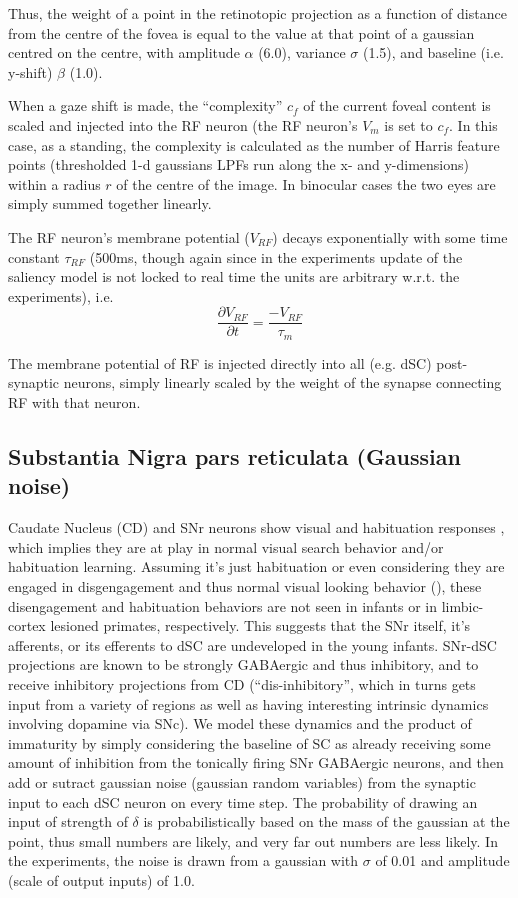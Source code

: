 \documentclass[conference]{IEEEtran}
\begin{document}
Thus, the weight of a point in the retinotopic projection as a
function of distance from the centre of the fovea is equal to the
value at that point of a gaussian centred on the centre, with
amplitude $\alpha$ (6.0), variance $\sigma$ (1.5), and baseline
(i.e. y-shift) $\beta$ (1.0).

When a gaze shift is made, the ``complexity'' $c_f$ of the current
foveal content is scaled and injected into the RF neuron (the RF
neuron's $V_m$ is set to $c_f$. In this case, as a standing, the
complexity is calculated as the number of Harris feature points
(thresholded 1-d gaussians LPFs run along the x- and y-dimensions)
within a radius $r$ of the centre of the image. In binocular cases the
two eyes are simply summed together linearly.

The RF neuron's membrane potential ($V_{RF}$) decays exponentially
with some time constant $\tau_{RF}$ (500ms, though again since in the
experiments update of the saliency model is not locked to real time
the units are arbitrary w.r.t. the experiments), i.e.
\begin{equation}
\frac{\partial V_{RF}}{\partial t} = \frac{-V_{RF}}{\tau_m}
\end{equation}

The membrane potential of RF is injected directly into all (e.g. dSC)
post-synaptic neurons, simply linearly scaled by the weight of the
synapse connecting RF with that neuron.

\subsection{Substantia Nigra pars reticulata (Gaussian noise)}

Caudate Nucleus (CD) and SNr neurons show visual and habituation
responses \cite{hikosaka_wurtz_1983_SNr1}, which implies they are at
play in normal visual search behavior and/or habituation
learning. Assuming it's just habituation or even considering they are
engaged in disgengagement and thus normal visual looking behavior
(\cite{johnson_1990}), these disengagement and habituation behaviors
are not seen in infants or in limbic-cortex lesioned primates,
respectively. This suggests that the SNr itself, it's afferents, or
its efferents to dSC are undeveloped in the young infants. SNr-dSC
projections are known to be strongly GABAergic and thus inhibitory,
and to receive inhibitory projections from CD (``dis-inhibitory'',
which in turns gets input from a variety of regions as well as having
interesting intrinsic dynamics involving dopamine via SNc). We model
these dynamics and the product of immaturity by simply considering the
baseline of SC as already receiving some amount of inhibition from the
tonically firing SNr GABAergic neurons, and then add or sutract
gaussian noise (gaussian random variables) from the synaptic input to
each dSC neuron on every time step. The probability of drawing an
input of strength of $\delta$ is probabilistically based on the mass
of the gaussian at the point, thus small numbers are likely, and very
far out numbers are less likely. In the experiments, the noise is
drawn from a gaussian with $\sigma$ of 0.01 and amplitude (scale of
output inputs) of 1.0.
\end{document}
